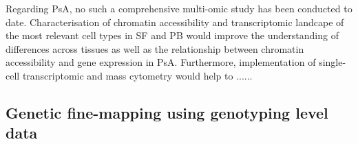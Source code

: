 Regarding PsA, no such a comprehensive multi-omic study has been conducted to date. Characterisation of chromatin accessibility and transcriptomic landcape of the most relevant cell types in SF and PB would improve the understanding of differences across tissues as well as the relationship between chromatin accessibility and gene expression in PsA. Furthermore, implementation of single-cell transcriptomic and mass cytometry would help to  ......



\subsection{Genetic fine-mapping using genotyping level data}
%
%
%

